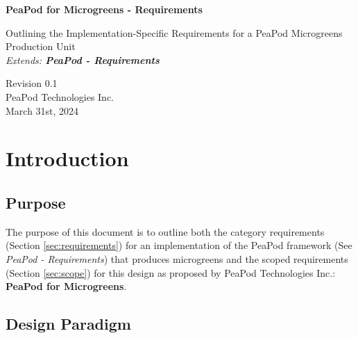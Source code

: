 \documentclass{../../../../docs/tex/report}
\begin{document}
\begin{titlepage}
    \begin{center}
        \vspace*{1.2cm}

        \textbf{\large{PeaPod for Microgreens - Requirements}}

        \vspace{0.5cm}

        Outlining the Implementation-Specific Requirements for a PeaPod Microgreens Production Unit\\

        \textit{Extends: \textbf{PeaPod - Requirements}}

        \vfill
        
        \vspace{1.25cm}

        Revision 0.1\\
        PeaPod Technologies Inc.\\
        March 31st, 2024

    \end{center}
\end{titlepage}

\thispagestyle{plain}

\tableofcontents
\newpage

\section{Introduction}
\label{sec:intro}

\subsection{Purpose}
\label{sec:purpose}

The purpose of this document is to outline both the category requirements (Section \ref{sec:requirements}) for an implementation of the PeaPod framework (See \textit{PeaPod - Requirements}) that produces microgreens and the scoped requirements (Section \ref{sec:scope}) for this design as proposed by PeaPod Technologies Inc.: \textbf{PeaPod for Microgreens}.

\subsection{Design Paradigm}
\label{sec:structure}


\end{document}
